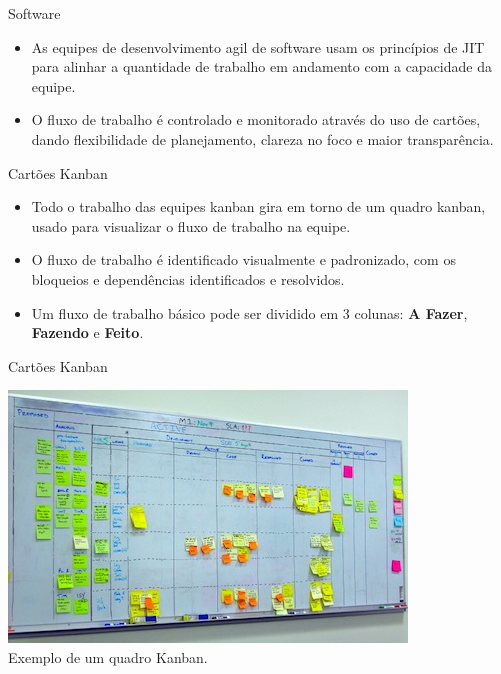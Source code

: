 \begin{frame}{\insertlecture}{Software}

  \begin{itemize}[<+-| alert@+>]
  \item As equipes de desenvolvimento agil de software usam os
    princípios de JIT para alinhar a quantidade de trabalho em 
    andamento com a capacidade da equipe.
  \item O fluxo de trabalho é controlado e monitorado através do uso
    de cartões, dando flexibilidade de planejamento, clareza no foco e
    maior transparência.
  \end{itemize}

\end{frame}

\begin{frame}{Cartões Kanban}
  
  \begin{itemize}[<+-| alert@+>]
  \item Todo o trabalho das equipes kanban gira em torno de um 
    quadro kanban, usado para visualizar o fluxo de trabalho 
    na equipe.
  \item O fluxo de trabalho é identificado visualmente e padronizado, 
    com os bloqueios e dependências identificados e resolvidos.
  \item Um fluxo de trabalho básico pode ser dividido em 3 colunas:
    {\bf A Fazer}, {\bf Fazendo} e {\bf Feito}.
  \end{itemize}


\end{frame}

\begin{frame}{Cartões Kanban}

  \begin{center}
    \includegraphics[scale=.5]{img/kanban-projeto.png}\\
    \bigskip
    Exemplo de um quadro Kanban.
  \end{center}

\end{frame}

